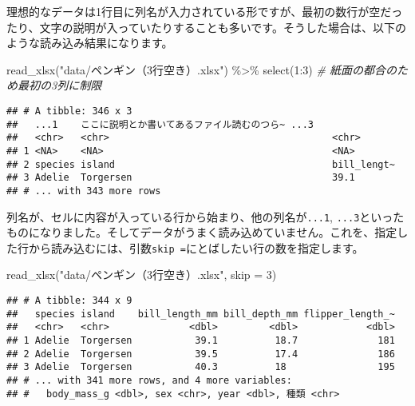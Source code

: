 \documentclass[
  xelatex,ja=standard, b5paper]{bxjsbook}
\newenvironment{Shaded}{\begin{snugshade}}{\end{snugshade}}
\newcommand{\AttributeTok}[1]{\textcolor[rgb]{0.77,0.63,0.00}{#1}}
\newcommand{\CommentTok}[1]{\textcolor[rgb]{0.56,0.35,0.01}{\textit{#1}}}
\newcommand{\DecValTok}[1]{\textcolor[rgb]{0.00,0.00,0.81}{#1}}
\newcommand{\FunctionTok}[1]{\textcolor[rgb]{0.00,0.00,0.00}{#1}}
\newcommand{\NormalTok}[1]{#1}
\newcommand{\SpecialCharTok}[1]{\textcolor[rgb]{0.00,0.00,0.00}{#1}}
\newcommand{\StringTok}[1]{\textcolor[rgb]{0.31,0.60,0.02}{#1}}
\begin{document}
理想的なデータは1行目に列名が入力されている形ですが、最初の数行が空だったり、文字の説明が入っていたりすることも多いです。そうした場合は、以下のような読み込み結果になります。

\begin{Shaded}
\begin{Highlighting}[]
\FunctionTok{read\_xlsx}\NormalTok{(}\StringTok{"data/ペンギン（3行空き）.xlsx"}\NormalTok{) }\SpecialCharTok{\%\textgreater{}\%} 
  \FunctionTok{select}\NormalTok{(}\DecValTok{1}\SpecialCharTok{:}\DecValTok{3}\NormalTok{) }\CommentTok{\# 紙面の都合のため最初の3列に制限}
\end{Highlighting}
\end{Shaded}

\begin{verbatim}
## # A tibble: 346 x 3
##   ...1    ここに説明とか書いてあるファイル読むのつら~ ...3       
##   <chr>   <chr>                                       <chr>      
## 1 <NA>    <NA>                                        <NA>       
## 2 species island                                      bill_lengt~
## 3 Adelie  Torgersen                                   39.1       
## # ... with 343 more rows
\end{verbatim}

列名が、セルに内容が入っている行から始まり、他の列名が\texttt{...1}, \texttt{...3}といったものになりました。そしてデータがうまく読み込めていません。これを、指定した行から読み込むには、引数\texttt{skip\ =}にとばしたい行の数を指定します。

\begin{Shaded}
\begin{Highlighting}[]
\FunctionTok{read\_xlsx}\NormalTok{(}\StringTok{"data/ペンギン（3行空き）.xlsx"}\NormalTok{, }\AttributeTok{skip =} \DecValTok{3}\NormalTok{)}
\end{Highlighting}
\end{Shaded}

\begin{verbatim}
## # A tibble: 344 x 9
##   species island    bill_length_mm bill_depth_mm flipper_length_~
##   <chr>   <chr>              <dbl>         <dbl>            <dbl>
## 1 Adelie  Torgersen           39.1          18.7              181
## 2 Adelie  Torgersen           39.5          17.4              186
## 3 Adelie  Torgersen           40.3          18                195
## # ... with 341 more rows, and 4 more variables:
## #   body_mass_g <dbl>, sex <chr>, year <dbl>, 種類 <chr>
\end{verbatim}
\end{document}
